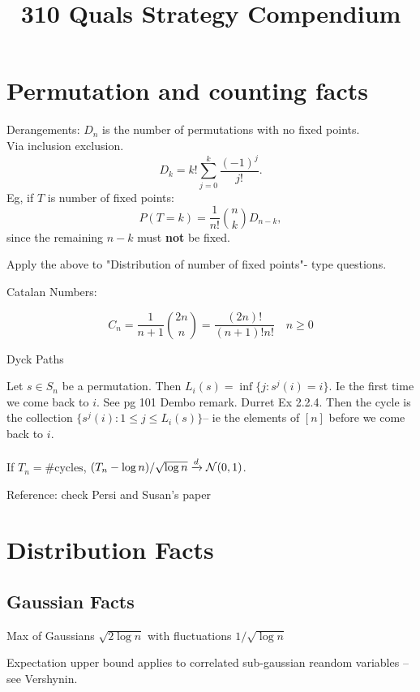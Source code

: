 \documentclass{article}
\title{310 Quals Strategy Compendium}
\begin{document}
\maketitle

\section{Permutation and counting facts}
\begin{fact}
Derangements: $D_n$ is the number of permutations with no fixed points.\\

Via inclusion exclusion.
$$D_k = k! \sum_{j=0}^{k} \frac{(-1)^j}{j!}.$$
Eg, if $T$ is number of fixed points:
$$P(T=k) = \frac{1}{n!} \binom{n}{k} D_{n-k},$$
since the remaining $n-k$ must \textbf{not} be fixed.

    
\end{fact}
Apply the above to "Distribution of number of fixed points"- type questions. 

\begin{fact}
	Catalan Numbers: 
	
	$$C_n = \frac{1}{n+1} \binom{2n}{n} = \frac{(2n)!}{(n+1)! n!} \quad n\geq 0$$
	
	
		Dyck Paths 
\end{fact}

\begin{definition}[Cycles]
	Let $s \in S_n$ be a permutation. Then $L_i(s) = \inf \{j: s^j(i) = i\}$. Ie the first time we come back to $i$. See pg 101 Dembo remark. Durret Ex 2.2.4. Then the cycle is the collection $\{s^j(i): 1\leq j\leq L_i(s)\}$-- ie the elements of $[n]$ before we come back to $i$. \\\\
	If $T_n = \# \text{cycles}$, $(T_n - \log n)/\sqrt{\log n} \xrightarrow{d} \mathcal N(0,1)$. 
\end{definition}

\begin{definition}[Descents]
	
\end{definition}

Reference: check Persi and Susan's paper


\section{Distribution Facts}
\subsection{Gaussian Facts}
\begin{fact}
	Max of Gaussians $\sqrt{2\log n}$ with fluctuations $1/\sqrt{\log n} $
\end{fact}
\begin{fact} 
	Expectation upper bound applies to correlated sub-gaussian reandom variables -- see Vershynin. 
\end{fact}
\begin{fact}
	
\end{fact}
\end{document}
